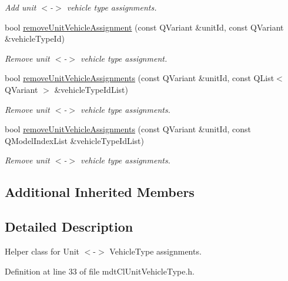 \begin{DoxyCompactItemize}
\begin{DoxyCompactList}\small\item\em Add unit $<$-\/$>$ vehicle type assignments. \end{DoxyCompactList}\item 
bool \hyperlink{classmdt_cl_unit_vehicle_type_a399321985befccc70d82a2aff09c409e}{remove\-Unit\-Vehicle\-Assignment} (const Q\-Variant \&unit\-Id, const Q\-Variant \&vehicle\-Type\-Id)
\begin{DoxyCompactList}\small\item\em Remove unit $<$-\/$>$ vehicle type assignment. \end{DoxyCompactList}\item 
bool \hyperlink{classmdt_cl_unit_vehicle_type_a18480c7eb4f54f4006747d17c18679e5}{remove\-Unit\-Vehicle\-Assignments} (const Q\-Variant \&unit\-Id, const Q\-List$<$ Q\-Variant $>$ \&vehicle\-Type\-Id\-List)
\begin{DoxyCompactList}\small\item\em Remove unit $<$-\/$>$ vehicle type assignments. \end{DoxyCompactList}\item 
bool \hyperlink{classmdt_cl_unit_vehicle_type_aec5d0729ab36a35c83e472e6e69f2e86}{remove\-Unit\-Vehicle\-Assignments} (const Q\-Variant \&unit\-Id, const Q\-Model\-Index\-List \&vehicle\-Type\-Id\-List)
\begin{DoxyCompactList}\small\item\em Remove unit $<$-\/$>$ vehicle type assignments. \end{DoxyCompactList}\end{DoxyCompactItemize}
\subsection*{Additional Inherited Members}


\subsection{Detailed Description}
Helper class for Unit $<$-\/$>$ Vehicle\-Type assignments. 

Definition at line 33 of file mdt\-Cl\-Unit\-Vehicle\-Type.\-h.



